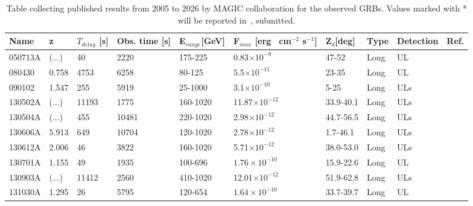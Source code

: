 \begin{longtable}{llllllllll}
\caption{Table collecting published results from 2005 to 2026 by MAGIC collaboration for the observed GRBs. Values marked with * will be reported in~\cite{YusukeSuda2026}, submitted.}
\label{table:MAGICGRBlist}\\
\toprule
\textbf{Name}&\textbf{z}& \textbf{$T_{delay}$ [s]}  & \textbf{Obs. time [s]} & \textbf{E$_{range}$[GeV]} & \textbf{F$_{max}$} [erg \, cm$^{-2}$ s$^{-1}$]  & \textbf{Z$_{d}$[deg]} & \textbf{Type} & \textbf{Detection} & \textbf{Ref.}\\
			\midrule 
050713A & (...)   & 40 & 2220 & 175-225 &  0.83$\times10^{-9}$ & 47-52 & Long & UL &  \cite{2006ApJ...641L...9A}\\
			\midrule 
080430 & 0.758  & 4753 & 6258 & 80-125 & 5.5$\times10^{-11}$ & 23-35  & Long  & UL &  \cite{2010AeA...517A...5A}\\
			\midrule 
090102 & 1.547 & 255 & 5919 & 25-1000 &  3.1$\times10^{-10}$  & 5-25 & Long & ULs &  \cite{2014MNRAS.437.3103A,2009arXiv0907.0996G}\\
			\midrule 
130502A & (...)  & 11193 & 1775 & 160-1020 & 11.87$\times10^{-12}$  & 33.9-40.1 & Long & ULs &  \cite{2025AeA...700A..96A}  \\
                \midrule
130504A & (...)  & 455 & 10481 & 220-1020 &  2.98$\times10^{-12}$  & 44.7-56.5 & Long & ULs & \cite{2025AeA...700A..96A}  \\
                \midrule
130606A & 5.913 & 649 & 10704 & 120-1020 & 2.78$\times10^{-12}$  & 1.7-46.1 & Long & ULs & \cite{2025AeA...700A..96A}  \\
                \midrule
130612A & 2.006 & 46 & 3822 &  160-1020  & 5.71$\times10^{-12}$  & 38.0-53.0 & Long & ULs & \cite{2025AeA...700A..96A}  \\
                \midrule
130701A & 1.155 & 49 & 1935 & 100-696 & $1.76 \times10^{-10}$ &  15.9-22.6 & Long & UL & \cite{2025AeA...700A..96A}  \\
                \midrule
130903A & (...)  & 11412 & 2560 & 410-1020 & 12.01$\times10^{-12}$   & 51.9-62.8 & Long & ULs & \cite{2025AeA...700A..96A}  \\
                \midrule
131030A & 1.295 & 26 & 5795 &  120-654  & $1.64 \times10^{-10}$ & 33.7-39.7 & Long & UL & \cite{2025AeA...700A..96A}  \\

\end{longtable}
